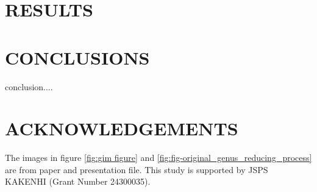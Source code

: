 \documentclass[a4paper,twoside]{article}
\begin{document}
\section{\uppercase{Results}}
\label{sec:result}
\section{\uppercase{Conclusions}}
\label{sec:conclusion}

\noindent conclusion....



\section*{\uppercase{Acknowledgements}}
\noindent The images in figure \ref{fig:gim figure} and \ref{fig:fig-original_genus_reducing_process}  are from \cite{Gu:2002:GI:566654.566589} paper and presentation file. This study is supported by JSPS KAKENHI (Grant Number 24300035).


\vfill

{\small
}



\vfill
\end{document}
